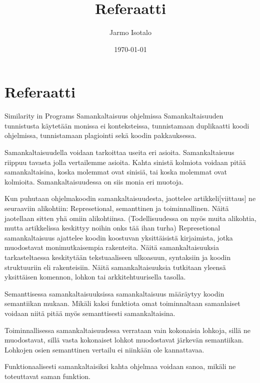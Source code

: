 \documentclass[finnish]{tktltiki2}
\title{Referaatti}
\author{Jarmo Isotalo}
\date{\today}
\theoremstyle{definition}
\theoremstyle{remark}
\begin{document}

\frontmatter      %

\maketitle        %
\makeabstract     %

\tableofcontents  %


\mainmatter       %
\section{Referaatti}
Similarity in Programs
Samankaltaisuus ohjelmissa
Samankaltaisuuden tunnistusta käytetään monissa ei konteksteissa, tunnistamaan duplikaatti koodi ohjelmissa, tunnistamaan plagiointi sekä koodin pakkauksessa.

Samankaltaisuudella voidaan tarkoittaa useita eri asioita. Samankaltaisuus riippuu tavasta jolla vertailemme asioita. Kahta sinistä kolmiota voidaan pitää samankaltaisina, koska molemmat ovat sinisiä, tai koska molemmat ovat kolmioita. Samankaltaisuudessa on siis monia eri muotoja.

Kun puhutaan ohjelmakoodin samankaltaisuudesta, jaottelee artikkeli[viittaus] ne seuraaviin alikohtiin: Represetional, semanttinen ja toiminnallinen. Näitä jaotellaan sitten yhä omiin alikohtiinsa.
(Todellisuudessa on myös muita alikohtia, mutta artikkelissa keskittyy noihin onks tää ihan turha)
Represetional samankaltaisuus ajattelee koodin koostuvan yksittäisistä kirjaimista, jotka muodostavat monimutkaisempia rakenteita. Näitä samankaltaisuuksia tarkasteltaessa keskitytään tekstuaaliseen ulkoasuun, syntaksiin ja koodin struktuuriin eli rakenteisiin.
Näitä samankaltaisuuksia tutkitaan yleensä yksittäisen komennon, lohkon tai arkkitehtuurisella tasolla.

Semanttisessa samankaltaisuuksissa samankaltaisuus määräytyy koodin semantiikan mukaan. Mikäli kaksi funktiota omat toiminnaltaan samanlaiset voidaan niitä pitää myös semanttisesti samankaltaisina.

Toiminnallisessa samankaltaisuudessa verrataan vain kokonaisia lohkoja, sillä ne muodostavat, sillä vasta kokonaiset lohkot muodostavat järkevän semantiikan. Lohkojen osien semanttinen vertailu ei niinkään ole kannattavaa. 

Funktionaalisesti samankaltaisiksi kahta ohjelmaa voidaan sanoa, mikäli ne toteuttavat saman funktion. 
\end{document}
